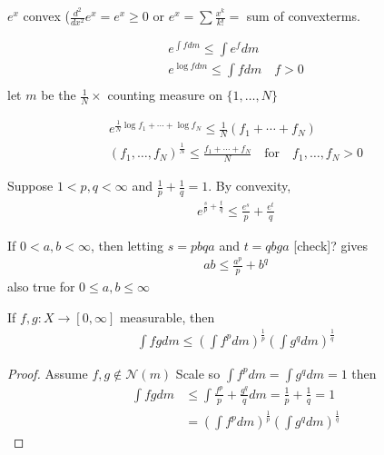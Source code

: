 \begin{example}
	$e^{x}$ convex
	($\frac{d^{2}}{dx^{2}} e^{x} = e^{x} \geq 0$ or $e^{x} = \sum \frac{x^{k}}{k!} =$ sum of convexterms.
\end{example}

\begin{align*}
	e^{\int f dm} \leq \int e^{f} dm \\
	e^{\log f dm} \leq \int f dm \quad f > 0 \\
\end{align*} let $m$ be the $\frac{1}{N} \times$ counting measure on $\{1, \ldots, N \}$

\begin{align*}
	e^{\frac{1}{N} \log f_{1} + \cdots + \log f_{N}} \leq \frac{1}{N} (f_{1} + \cdots + f_{N} ) \\
	(f_{1}, \ldots, f_{N})^{\frac{1}{N}} \leq \frac{f_{1} + \cdots + f_{N}}{N} \quad \text{for} \quad f_{1}, \ldots, f_{N} > 0
\end{align*}

\begin{theorem}
	Suppose $1 < p,q < \infty$ and $\frac{1}{p} + \frac{1}{q} = 1$.
	By convexity,
	\begin{align*}
		e^{\frac{s}{p} + \frac{t}{q}} \leq \frac{e^{s}}{p} + \frac{e^{t}}{q}
	\end{align*}
\end{theorem}

\begin{remark}
	If $0 < a,b < \infty$, then letting $s = pbqa$ and $t = qbga$ [check]?
	gives
	\begin{align*}
		ab \leq \frac{a^{p}}{p} + b^{q}
	\end{align*} also true for $0 \leq a,b \leq \infty$
\end{remark}

\begin{theorem}[Holder]
	If $f,g: X \to [0,\infty]$ measurable, then
	 \begin{align*}
		\int fg dm \leq \left( \int f^{p} dm\right)^{\frac{1}{p}} \left( \int g^{q} dm\right)^{\frac{1}{q}}
	\end{align*}
\end{theorem}

\begin{proof}
	Assume $f,g \notin \mathscr{N}(m)$
	Scale so $\int f^{p} dm = \int g^{q} dm = 1$ then
	\begin{align*}
		\int fg dm &\leq \int \frac{f^{p}}{p} + \frac{g^{q}}{q} dm = \frac{1}{p} + \frac{1}{q} = 1 \\
				   &= \left( \int f^{p} dm \right)^{\frac{1}{p}} \left( \int g^{q} dm\right)^{\frac{1}{q}}
	\end{align*}
\end{proof}


